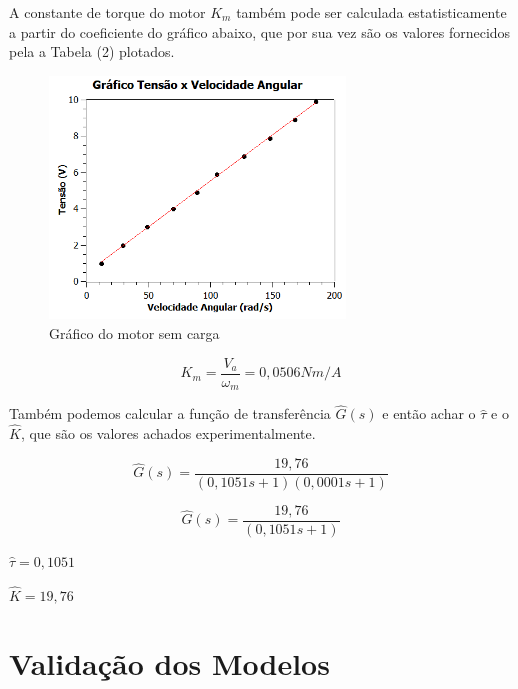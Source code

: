 \documentclass[12pt]{article}
\begin{document}
\quad A constante de torque do motor $K_m$ também pode ser calculada estatisticamente a partir do coeficiente do gráfico abaixo, que por sua vez são os valores fornecidos pela a Tabela (2) plotados.

\begin{figure}[H] %
    \centering
    \includegraphics[width = 0.7\textwidth]{GRÁFICO 02.png}
    \caption{Gráfico do motor sem carga}
    \label{fig:mesh4}
\end{figure}

\begin{equation}
    K_m = \frac{V_a}{\omega_m} = 0,0506 Nm/A
\end{equation}

\quad Também podemos calcular a função de transferência $\hat{G}(s)$ e então achar o $\hat{\tau}$ e o $\hat{K}$, que são os valores achados experimentalmente.

\begin{equation}
    \hat{G}(s) = \frac{19,76}{(0,1051 s + 1)(0,0001 s + 1)}
\end{equation}

\begin{equation}
    \hat{G}(s) = \frac{19,76}{(0,1051s + 1)}
\end{equation}

\begin{center}
    $\hat{\tau} = 0,1051$\\
\end{center}

\begin{center}
    $ \hat{K} = 19,76$
\end{center}

\section{Validação dos Modelos}
\end{document}
